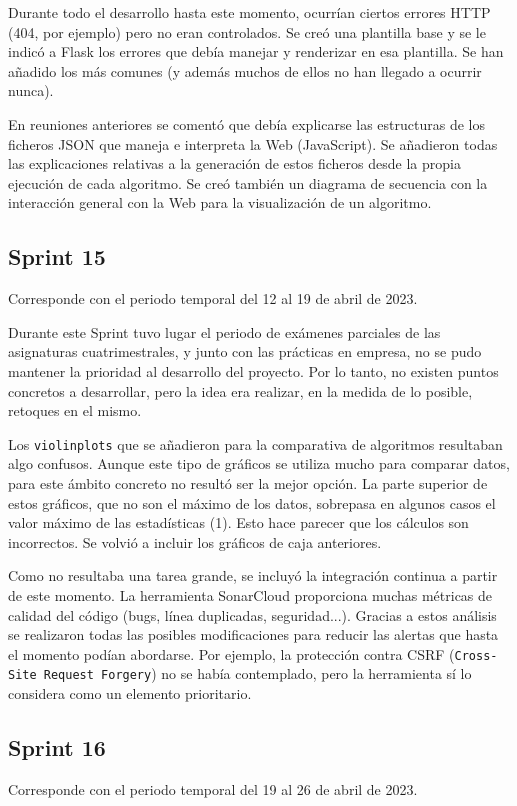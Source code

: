 Durante todo el desarrollo hasta este momento, ocurrían ciertos errores HTTP
(404, por ejemplo) pero no eran controlados. Se creó una plantilla base y se le
indicó a Flask los errores que debía manejar y renderizar en esa plantilla. Se
han añadido los más comunes (y además muchos de ellos no han llegado a ocurrir
nunca).

En reuniones anteriores se comentó que debía explicarse las estructuras de los
ficheros JSON que maneja e interpreta la Web (JavaScript). Se añadieron todas
las explicaciones relativas a la generación de estos ficheros desde la propia
ejecución de cada algoritmo. Se creó también un diagrama de secuencia con la
interacción general con la Web para la visualización de un algoritmo.

\subsection{Sprint 15}
Corresponde con el periodo temporal del 12 al 19 de abril de 2023.

Durante este Sprint tuvo lugar el periodo de exámenes parciales de las
asignaturas cuatrimestrales, y junto con las prácticas en empresa, no se pudo
mantener la prioridad al desarrollo del proyecto. Por lo tanto, no existen
puntos concretos a desarrollar, pero la idea era realizar, en la medida de lo
posible, retoques en el mismo.

Los \texttt{violinplots} que se añadieron para la comparativa de algoritmos
resultaban algo confusos. Aunque este tipo de gráficos se utiliza mucho para
comparar datos, para este ámbito concreto no resultó ser la mejor opción. La
parte superior de estos gráficos, que no son el máximo de los datos, sobrepasa
en algunos casos el valor máximo de las estadísticas (1). Esto hace parecer que
los cálculos son incorrectos. Se volvió a incluir los gráficos de caja
anteriores.

Como no resultaba una tarea grande, se incluyó la integración continua a partir
de este momento. La herramienta SonarCloud proporciona muchas métricas de
calidad del código (bugs, línea duplicadas, seguridad...). Gracias a estos
análisis se realizaron todas las posibles modificaciones para reducir las
alertas que hasta el momento podían abordarse. Por ejemplo, la protección contra
CSRF (\texttt{Cross-Site Request Forgery}) no se había contemplado, pero la
herramienta sí lo considera como un elemento prioritario.

\subsection{Sprint 16}
Corresponde con el periodo temporal del 19 al 26 de abril de 2023.

